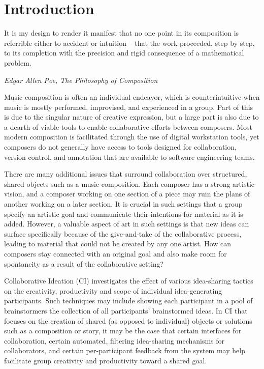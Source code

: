 \documentclass[final,authoryear,5p,times,twocolumn]{elsarticle}
\begin{document}
\section*{Introduction}
\label{sec:introduction}

\epigraph{It is my design to render it manifest that no one point in its composition is referrible either to accident or intuition -- that the work proceeded, step by step, to its completion with the precision and rigid consequence of a mathematical problem.}{\textit{Edgar Allen Poe, The Philosophy of Composition}}


Music composition is often an individual endeavor, which is counterintuitive when music is mostly performed, improvised, and experienced in a group. Part of this is due to the singular nature of creative expression, but a large part is also due to a dearth of viable tools to enable collaborative efforts between composers. Most modern composition is facilitated through the use of digital workstation tools, yet composers do not generally have access to tools designed for collaboration, version control, and annotation that are available to software engineering teams.

There are many additional issues that surround collaboration over structured, shared objects such as a music composition. Each composer has a strong artistic vision, and a composer working on one section of a piece may ruin the plans of another working on a later section. It is crucial in such settings that a group specify an artistic goal and communicate their intentions for material as it is added. However, a valuable aspect of art in such settings is that new ideas can surface specifically because of the give-and-take of the collaborative process, leading to material that could not be created by any one artist. How can composers stay connected with an original goal and also make room for spontaneity as a result of the collaborative setting?

Collaborative Ideation (CI) investigates the effect of various idea-sharing tactics on the creativity, productivity and scope of individual idea-generating participants. Such techniques may include showing each participant in a pool of brainstormers the collection of all participants' brainstormed ideas. In CI that focuses on the creation of shared (as opposed to individual) objects or solutions such as a composition or story, it may be the case that certain interfaces for collaboration, certain automated, filtering idea-sharing mechanisms for collaborators, and certain per-participant feedback from the system may help facilitate group creativity and productivity toward a shared goal.
\end{document}
